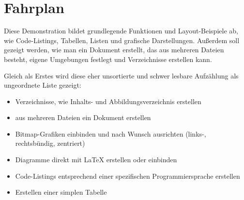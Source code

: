 \section{Fahrplan}

Diese Demonstration bildet grundlegende Funktionen und Layout-Beispiele ab, wie Code-Listings, Tabellen, Listen und grafische Darstellungen. Außerdem soll gezeigt werden, wie man ein Dokument erstellt, das aus mehreren Dateien besteht, eigene Umgebungen festlegt und Verzeichnisse erstellen kann.

Gleich als Erstes wird diese eher unsortierte und schwer lesbare Aufzählung als ungeordnete Liste gezeigt:

\begin{itemize}
	\item Verzeichnisse, wie Inhalts- und Abbildungsverzeichnis erstellen
	\item aus mehreren Dateien ein Dokument erstellen
	\item Bitmap-Grafiken einbinden und nach Wunsch ausrichten (links-, rechtsbündig, zentriert)
	\item Diagramme direkt mit LaTeX erstellen oder einbinden
	\item Code-Listings entsprechend einer spezifischen Programmiersprache erstellen
	\item Erstellen einer simplen Tabelle
\end{itemize}

\newpage